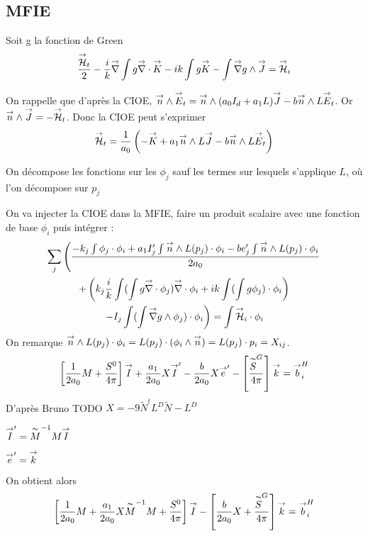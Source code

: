 \subsection{MFIE}
Soit g la fonction de Green
\[
  \frac{\vH_t}{2}-\frac{i}{k}\vgrad \int  g\vdiv\vK -  ik\int g\vK - \int \vgrad g \pvect \vJ = \vH_i
\]

On rappelle que d’après la CIOE, \(\vn \pvect \vE_t = \vn \pvect (a_0I_d+a_1L)\vJ -b\vn\pvect L\vE_t\). Or \(\vn\pvect \vJ = -\vH_t\). Donc la CIOE peut s'exprimer
\[
  \vH_t = \frac{1}{a_0}\left(-\vK + a_1 \vn\pvect L\vJ -b\vn\pvect L\vE_t\right)
\]

On décompose les fonctions sur les \(\phi_j\) sauf les termes sur lesquels s'applique \(L\), où l'on décompose sur \(p_j\) 

On va injecter la CIOE dans la MFIE, faire un produit scalaire avec une fonction de base \(\phi_i\) puis intégrer : 
\begin{multline}
  \sum_j \left(\frac{-k_j\int\phi_j\cdot\phi_i + a_1 I'_j \int \vn \pvect L (p_j) \cdot \phi_i  -be'_j\int \vn \pvect L(p_j)\cdot \phi_i}{2a_0} \right. \\
  +\left(k_j\frac{i}{k}\int (\int g\vdiv\phi_j)\vdiv \phi_i + ik\int (\int g\phi_j)\cdot \phi_i \right)\\
  \left. -  I_j\int(\int \vgrad g \pvect \phi_j) \cdot \phi_i \right)= \int \vH_i \cdot \phi_i
\end{multline}
On remarque \( \vn \pvect L(p_j)\cdot \phi_i = L(p_j)\cdot(\phi_i\pvect\vn) = L(p_j)\cdot p_i = X_{ij}\). 
\[
  \left[\frac{1}{2a_0}M + \frac{S^0}{4\pi}\right]\vect I + \frac{a_1}{2a_0}X\vect I' - \frac{b}{2a_0}X\vect e' - \left[ \frac{\tilde S^G}{4\pi}\right]\vect k = \vect b_i^H
\]
D’après Bruno TODO \(X = -9\tilde N^tL^D\tilde N - L^D\) %

\(\vect I' = \tilde M^{-1}M\vect I\)

\(\vect e' = \vect k\)

On obtient alors 
\[
  \left[\frac{1}{2a_0}M + \frac{a_1}{2a_0}X\tilde M^{-1}M + \frac{S^0}{4\pi}\right]\vect I - \left[\frac{b}{2a_0}X+ \frac{\tilde S^G}{4\pi}\right]\vect k = \vect b_i^H
\]

